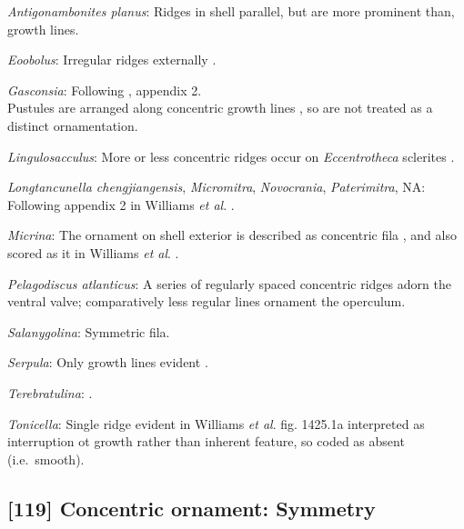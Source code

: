 \documentclass[openany]{book}
\theoremstyle{definition}
\theoremstyle{definition}
\theoremstyle{definition}
\theoremstyle{remark}
\begin{document}
\hypertarget{Antigonambonites_planus-coding-118}{}
\emph{Antigonambonites planus}: Ridges in shell parallel, but are more
prominent than, growth lines.

\hypertarget{Eoobolus-coding-118}{}
\emph{Eoobolus}: Irregular ridges externally
\citep{Williams2000LinguliformeaCraniiformea}.

\hypertarget{Gasconsia-coding-118}{}
\emph{Gasconsia}: Following \citet{Williams1998Thediversity}, appendix
2.\\
Pustules are arranged along concentric growth lines
\citep{Skovsted2005EarlyCambrian}, so are not treated as a distinct
ornamentation.

\hypertarget{Lingulosacculus-coding-118}{}
\emph{Lingulosacculus}: More or less concentric ridges occur on
\emph{Eccentrotheca} sclerites
\citep{Skovsted2011Scleritomeconstruction}.

\hypertarget{Longtancunella_chengjiangensis-coding-118}{}
\emph{Longtancunella chengjiangensis}, \emph{Micromitra},
\emph{Novocrania}, \emph{Paterimitra}, NA: Following appendix 2 in
Williams \emph{et al}. \citeyearpar{Williams1998Thediversity}.

\hypertarget{Micrina-coding-118}{}
\emph{Micrina}: The ornament on shell exterior is described as
concentric fila \citep[P.43]{Chen2007Reinterpretationof}, and also
scored as it in Williams \emph{et al}.
\citeyearpar[pp.160--163]{Williams2000LinguliformeaCraniiformea}.

\hypertarget{Pelagodiscus_atlanticus-coding-118}{}
\emph{Pelagodiscus atlanticus}: A series of regularly spaced concentric
ridges adorn the ventral valve; comparatively less regular lines
ornament the operculum.

\hypertarget{Salanygolina-coding-118}{}
\emph{Salanygolina}: Symmetric fila.

\hypertarget{Serpula-coding-118}{}
\emph{Serpula}: Only growth lines evident
\citep{Williams2000LinguliformeaCraniiformea}.

\hypertarget{Terebratulina-coding-118}{}
\emph{Terebratulina}: \citet{Zhang2013}.

\hypertarget{Tonicella-coding-118}{}
\emph{Tonicella}: Single ridge evident in Williams \emph{et al}.
\citeyearpar{Williams2006Rhynchonelliformeapart} fig. 1425.1a
interpreted as interruption ot growth rather than inherent feature, so
coded as absent (i.e.~smooth).

\subsection*{{[}119{]} Concentric ornament:
Symmetry}\label{concentric-ornament-symmetry}
\end{document}
